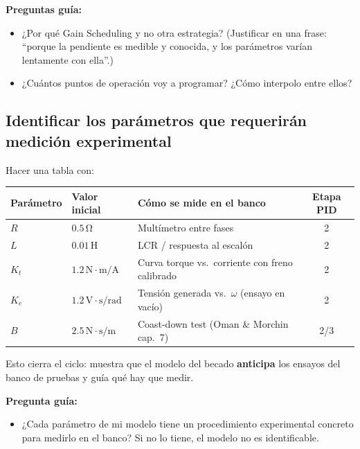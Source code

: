 \documentclass[11pt,a4paper]{article}
\newcommand{\unit}[1]{\,\mathrm{#1}}
\begin{document}
\begin{guia}
\textbf{Preguntas guía:}
\begin{itemize}
    \item ¿Por qué Gain Scheduling y no otra estrategia? (Justificar en una frase: ``porque la pendiente es medible y conocida, y los parámetros varían lentamente con ella''.)
    \item ¿Cuántos puntos de operación voy a programar? ¿Cómo interpolo entre ellos?
\end{itemize}
\end{guia}

\subsection{Identificar los parámetros que requerirán medición experimental}

Hacer una tabla con:

\begin{table}[h]
\centering
\begin{tabularx}{\linewidth}{l l X c}
\toprule
Parámetro & Valor inicial & Cómo se mide en el banco & Etapa PID \\
\midrule
$R$  & $0.5\unit{\Omega}$           & Multímetro entre fases & 2 \\
$L$  & $0.01\unit{H}$               & LCR / respuesta al escalón & 2 \\
$K_t$ & $1.2\unit{N\cdot m/A}$      & Curva torque vs.\ corriente con freno calibrado & 2 \\
$K_e$ & $1.2\unit{V\cdot s/rad}$    & Tensión generada vs.\ $\omega$ (ensayo en vacío) & 2 \\
$B$  & $2.5\unit{N\cdot s/m}$       & Coast-down test (Oman \& Morchin cap.~7) & 2/3 \\
\bottomrule
\end{tabularx}
\end{table}

Esto cierra el ciclo: muestra que el modelo del becado \textbf{anticipa} los ensayos del banco de pruebas y guía qué hay que medir.

\begin{guia}
\textbf{Pregunta guía:}
\begin{itemize}
    \item ¿Cada parámetro de mi modelo tiene un procedimiento experimental concreto para medirlo en el banco? Si no lo tiene, el modelo no es identificable.
\end{itemize}
\end{guia}
\end{document}
